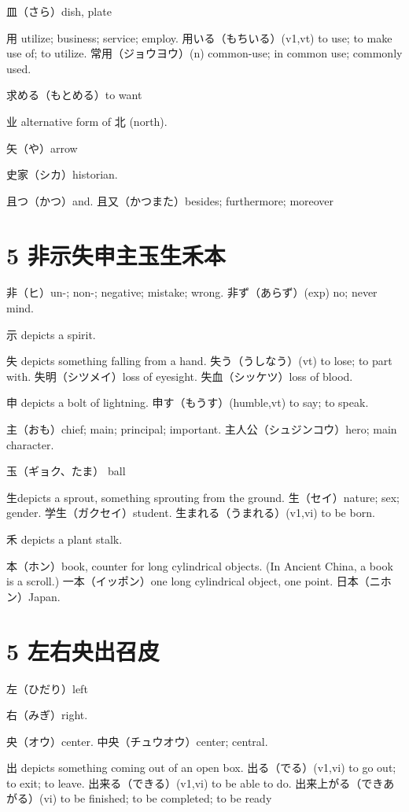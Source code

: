 皿（さら）dish, plate

用 utilize; business; service; employ.
用いる（もちいる）(v1,vt) to use; to make use of; to utilize.
常用（ジョウヨウ）(n) common-use; in common use; commonly used.

求める（もとめる）to want

业 alternative form of 北 (north).

矢（や）arrow

史家（シカ）historian.

且つ（かつ）and.
且又（かつまた）besides; furthermore; moreover

\section{5 非⽰失申主玉生禾本}

非（ヒ）un-; non-; negative; mistake; wrong.
非ず（あらず）(exp) no; never mind.

⽰ depicts a spirit.

失 depicts something falling from a hand.
失う（うしなう）(vt) to lose; to part with.
失明（シツメイ）loss of eyesight.
失血（シッケツ）loss of blood.

申 depicts a bolt of lightning.
申す（もうす）(humble,vt) to say; to speak.

主（おも）chief; main; principal; important.
主人公（シュジンコウ）hero; main character.

玉（ギョク、たま） ball

生depicts a sprout, something sprouting from the ground.
生（セイ）nature; sex; gender.
学生（ガクセイ）student.
生まれる（うまれる）(v1,vi) to be born.

禾 depicts a plant stalk.

本（ホン）book, counter for long cylindrical objects.
(In Ancient China, a book is a scroll.)
一本（イッポン）one long cylindrical object, one point.
日本（ニホン）Japan.

\section{5 左右央出召皮}

左（ひだり）left

右（みぎ）right.

央（オウ）center.
中央（チュウオウ）center; central.

出 depicts something coming out of an open box.
出る（でる）(v1,vi) to go out; to exit; to leave.
出来る（できる）(v1,vi) to be able to do.
出来上がる（できあがる）(vi) to be finished; to be completed; to be ready

